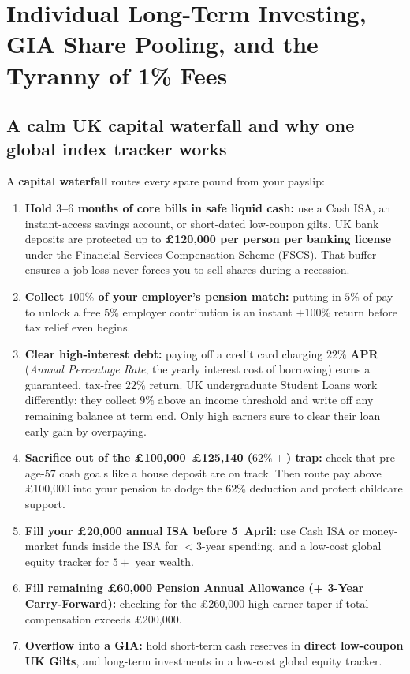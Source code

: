 \section{Individual Long-Term Investing, GIA Share Pooling, and the Tyranny of 1\% Fees}

\subsection{A calm UK capital waterfall and why one global index tracker works}

A \textbf{capital waterfall} routes every spare pound from your payslip:
\begin{enumerate}
  \item \textbf{Hold $3$--$6$ months of core bills in safe liquid cash:} use a Cash ISA, an instant-access savings account, or short-dated low-coupon gilts. UK bank deposits are protected up to \textbf{\pounds 120,000 per person per banking license} under the Financial Services Compensation Scheme (FSCS). That buffer ensures a job loss never forces you to sell shares during a recession.
  \item \textbf{Collect $100\%$ of your employer's pension match:} putting in $5\%$ of pay to unlock a free $5\%$ employer contribution is an instant $+100\%$ return before tax relief even begins.
  \item \textbf{Clear high-interest debt:} paying off a credit card charging $22\%$ \textbf{APR} (\emph{Annual Percentage Rate}, the yearly interest cost of borrowing) earns a guaranteed, tax-free $22\%$ return. UK undergraduate Student Loans work differently: they collect $9\%$ above an income threshold and write off any remaining balance at term end. Only high earners sure to clear their loan early gain by overpaying.
  \item \textbf{Sacrifice out of the \pounds 100,000--\pounds 125,140 ($62\%+$) trap:} check that pre-age-$57$ cash goals like a house deposit are on track. Then route pay above \pounds 100,000 into your pension to dodge the $62\%$ deduction and protect childcare support.
  \item \textbf{Fill your \pounds 20,000 annual ISA before 5~April:} use Cash ISA or money-market funds inside the ISA for $<3$-year spending, and a low-cost global equity tracker for $5+$ year wealth.
  \item \textbf{Fill remaining \pounds 60,000 Pension Annual Allowance (+ 3-Year Carry-Forward):} checking for the \pounds 260,000 high-earner taper if total compensation exceeds \pounds 200,000.
  \item \textbf{Overflow into a GIA:} hold short-term cash reserves in \textbf{direct low-coupon UK Gilts}, and long-term investments in a low-cost global equity tracker.
\end{enumerate}

